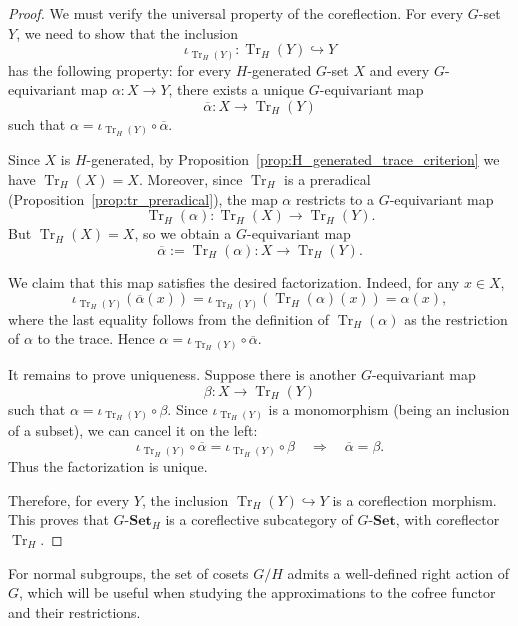 \documentclass[10pt,a4paper]{amsart}
\begin{document}
\begin{proof}
We must verify the universal property of the coreflection. For every $G$-set $Y$, we need to show that the inclusion
\[
\iota_{\operatorname{Tr}_H(Y)} \colon \operatorname{Tr}_H(Y) \hookrightarrow Y
\]
has the following property: for every $H$-generated $G$-set $X$ and every $G$-equivariant map $\alpha \colon X \longrightarrow Y$, there exists a unique $G$-equivariant map
\[
\overline{\alpha} \colon X \longrightarrow \operatorname{Tr}_H(Y)
\]
such that $\alpha = \iota_{\operatorname{Tr}_H(Y)} \circ \overline{\alpha}$.

Since $X$ is $H$-generated, by Proposition~\ref{prop:H_generated_trace_criterion} we have $\operatorname{Tr}_H(X) = X$. Moreover, since $\operatorname{Tr}_H$ is a preradical (Proposition~\ref{prop:tr_preradical}), the map $\alpha$ restricts to a $G$-equivariant map
\[
\operatorname{Tr}_H(\alpha) \colon \operatorname{Tr}_H(X) \longrightarrow \operatorname{Tr}_H(Y).
\]
But $\operatorname{Tr}_H(X) = X$, so we obtain a $G$-equivariant map
\[
\overline{\alpha} := \operatorname{Tr}_H(\alpha) \colon X \longrightarrow \operatorname{Tr}_H(Y).
\]

We claim that this map satisfies the desired factorization. Indeed, for any $x \in X$,
\[
\iota_{\operatorname{Tr}_H(Y)}(\overline{\alpha}(x))
= \iota_{\operatorname{Tr}_H(Y)}(\operatorname{Tr}_H(\alpha)(x))
= \alpha(x),
\]
where the last equality follows from the definition of $\operatorname{Tr}_H(\alpha)$ as the restriction of $\alpha$ to the trace. Hence $\alpha = \iota_{\operatorname{Tr}_H(Y)} \circ \overline{\alpha}$.

It remains to prove uniqueness. Suppose there is another $G$-equivariant map
\[
\beta \colon X \longrightarrow \operatorname{Tr}_H(Y)
\]
such that $\alpha = \iota_{\operatorname{Tr}_H(Y)} \circ \beta$. Since $\iota_{\operatorname{Tr}_H(Y)}$ is a monomorphism (being an inclusion of a subset), we can cancel it on the left:
\[
\iota_{\operatorname{Tr}_H(Y)} \circ \overline{\alpha}
= \iota_{\operatorname{Tr}_H(Y)} \circ \beta
\quad \Longrightarrow \quad
\overline{\alpha} = \beta.
\]
Thus the factorization is unique.

Therefore, for every $Y$, the inclusion $\operatorname{Tr}_H(Y) \hookrightarrow Y$ is a coreflection morphism. This proves that $G\text{-}\mathbf{Set}_H$ is a coreflective subcategory of $G\text{-}\mathbf{Set}$, with coreflector $\operatorname{Tr}_H$.
\end{proof}

For normal subgroups, the set of cosets $G/H$ admits a well-defined right action of $G$, which will be useful when studying the approximations to the cofree functor and their restrictions.
\end{document}
